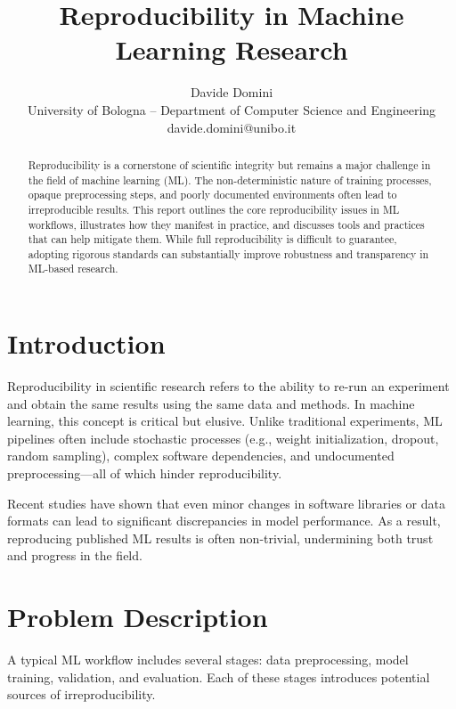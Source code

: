 \documentclass[11pt]{article}
\begin{document}
%
\title{Reproducibility in Machine Learning Research}
\author{Davide Domini \\
University of Bologna -- Department of Computer Science and Engineering\\
davide.domini@unibo.it
}
\maketitle



\begin{abstract}
Reproducibility is a cornerstone of scientific integrity but remains a major challenge 
 in the field of machine learning (ML). 
%
The non-deterministic nature of training processes, opaque preprocessing steps, 
 and poorly documented environments often lead to irreproducible results. 
%
This report outlines the core reproducibility issues in ML workflows, 
 illustrates how they manifest in practice, and discusses tools 
 and practices that can help mitigate them. 
% 
While full reproducibility is difficult to guarantee, adopting rigorous standards 
 can substantially improve robustness and transparency in ML-based research.
\end{abstract}

\section{Introduction}
\label{sec:introduction}
Reproducibility in scientific research refers to the ability to re-run an experiment and 
 obtain the same results using the same data and methods. 
% 
In machine learning, this concept is critical but elusive. 
%
Unlike traditional experiments, ML pipelines often include stochastic processes 
 (e.g., weight initialization, dropout, random sampling), complex software dependencies, 
 and undocumented preprocessing---all of which hinder reproducibility.

Recent studies have shown that even minor changes in software libraries or data formats can 
 lead to significant discrepancies in model performance. 
% 
As a result, reproducing published ML results is often non-trivial, 
 undermining both trust and progress in the field.

\section{Problem Description}
\label{sec:problem}
A typical ML workflow includes several stages: data preprocessing, model training, validation, and evaluation. Each of these stages introduces potential sources of irreproducibility.
\end{document}
